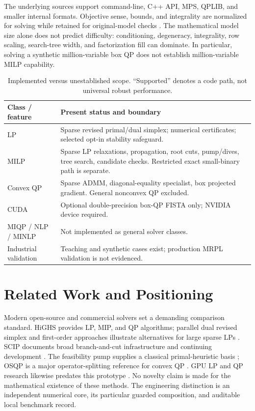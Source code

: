 \documentclass[10pt,a4paper,twocolumn]{article}
\begin{document}
The underlying sources support command-line, C++ API, MPS, QPLIB, and smaller internal formats. Objective sense, bounds, and integrality are normalized for solving while retained for original-model checks \cite{arch}. The mathematical model size alone does not predict difficulty: conditioning, degeneracy, integrality, row scaling, search-tree width, and factorization fill can dominate. In particular, solving a synthetic million-variable box QP does not establish million-variable MILP capability.

\begin{table}[t]
\centering\small
\caption{Implemented versus unestablished scope. ``Supported'' denotes a code path, not universal robust performance.}
\label{tab:scope}
\begin{tabularx}{\columnwidth}{@{}p{}X@{}}
\toprule
Class / feature & Present status and boundary\\
\midrule
LP & Sparse revised primal/dual simplex; numerical certificates; selected opt-in stability safeguard.\\
MILP & Sparse LP relaxations, propagation, root cuts, pump/dives, tree search, candidate checks. Restricted exact small-binary path is separate.\\
Convex QP & Sparse ADMM, diagonal-equality specialist, box projected gradient. General nonconvex QP excluded.\\
CUDA & Optional double-precision box-QP FISTA only; NVIDIA device required.\\
MIQP / NLP / MINLP & Not implemented as general solver classes.\\
Industrial validation & Teaching and synthetic cases exist; production MRPL validation is not evidenced.\\
\bottomrule
\end{tabularx}
\end{table}

\section{Related Work and Positioning}

Modern open-source and commercial solvers set a demanding comparison standard. HiGHS provides LP, MIP, and QP algorithms; parallel dual revised simplex and first-order approaches illustrate alternatives for large sparse LPs \cite{huangfu2018,pdlp2021,highs}. SCIP documents broad branch-and-cut infrastructure and continuing development \cite{achterberg2009,scip2025}. The feasibility pump supplies a classical primal-heuristic basis \cite{pump2005}; OSQP is a major operator-splitting reference for convex QP \cite{osqp2020}. GPU LP and QP research likewise predates this prototype \cite{cupdlp2025,gpuadmm2020}. No novelty claim is made for the mathematical existence of these methods. The engineering distinction is an independent numerical core, its particular guarded composition, and auditable local benchmark record.
\end{document}
